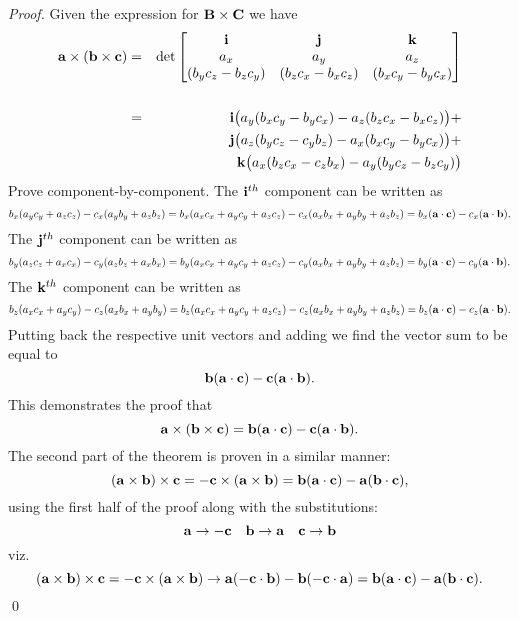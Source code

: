 \begin{proof}
Given the expression for ${\bf B} \times {\bf C}$ we have 
\begin{eqnarray*}
{\bf a} \times ({\bf b} \times {\bf c}) &=& 
\det\begin{bmatrix}
{\bf i} & {\bf j} & {\bf k}\\
a_x & a_y & a_z  \\
(b_yc_z - b_zc_y)&(b_zc_x - b_xc_z)  &  (b_xc_y-b_yc_x)\\
\end{bmatrix} \\ \\
&=& {\bf i} \big( a_y(b_xc_y-b_yc_x) - a_z(b_zc_x - b_xc_z) \big) + \\  
&\null & {\bf j} \big( a_z(b_yc_z - c_yb_z) - a_x(b_xc_y-b_yc_x) \big) + \\  
&\null & {\bf k} \big( a_x(b_zc_x - c_zb_x) - a_y(b_yc_z-b_zc_y) \big) \\  
\end{eqnarray*}
Prove component-by-component. The ${\bf i}^{th}$ component can be written as 
$$ b_x (a_yc_y + a_zc_z) - c_x(a_yb_y + a_zb_z)  = b_x (a_xc_x + a_yc_y + a_zc_z) - c_x(a_xb_x +a_yb_y + a_zb_z) = b_x( {\bf a}\cdot{\bf c}) - c_x({\bf a}\cdot{\bf b}).$$  
The ${\bf j}^{th}$ component can be written as 
$$ b_y (a_zc_z + a_xc_x) - c_y(a_zb_z + a_xb_x)  = b_y (a_xc_x + a_yc_y + a_zc_z) - c_y(a_xb_x +a_yb_y + a_zb_z) = b_y( {\bf a}\cdot{\bf c}) - c_y({\bf a}\cdot{\bf b}).$$  
The ${\bf k}^{th}$ component can be written as 
$$ b_z (a_xc_x + a_yc_y) - c_z(a_xb_x + a_yb_y)  = b_z (a_xc_x + a_yc_y + a_zc_z) - c_z(a_xb_x +a_yb_y + a_zb_z) = b_z( {\bf a}\cdot{\bf c}) - c_z({\bf a}\cdot{\bf b}).$$  
Putting back the respective unit vectors and adding we find the vector sum to be equal to
\[ {\bf b}({\bf a}\cdot {\bf c}) - {\bf c}({\bf a}\cdot {\bf b}).\] This demonstrates the proof that 
\[ {\bf a} \times ({\bf b} \times {\bf c}) = {\bf b}({\bf a}\cdot {\bf c}) - {\bf c}({\bf a}\cdot {\bf b}).\]
The second part of the theorem is proven in a similar manner:
\[ ({\bf a} \times {\bf b}) \times {\bf c}  = - {\bf c} \times ({\bf a} \times {\bf b}) = {\bf b}({\bf a}\cdot {\bf c}) - {\bf a}({\bf b}\cdot {\bf c}), \] using the first half of the proof along with the substitutions:
\[ {\bf a} \rightarrow -{\bf c}\quad {\bf b} \rightarrow {\bf a}\quad {\bf c} \rightarrow {\bf b}\] viz.
\[ ({\bf a} \times {\bf b}) \times {\bf c}  = -{\bf c} \times ({\bf a} \times {\bf b})  \rightarrow {\bf a} (-{\bf c}\cdot{\bf b}) - {\bf b} (-{\bf c}\cdot{\bf a}) = {\bf b}({\bf a}\cdot{\bf c}) -{\bf a}({\bf b}\cdot{\bf c}).\]\qed
\end{proof}

